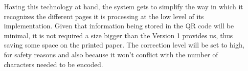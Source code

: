 Having this technology at hand, the system gets to simplify the way in which it recognizes the different pages it is processing at the low level of its implementation. Given that information being stored in the QR code will be minimal, it is not required a size bigger than the Version 1 provides us, thus saving some space on the printed paper. The correction level will be set to high, for safety reasons and also because it won’t conflict with the number of characters needed to be encoded.

\clearpage

